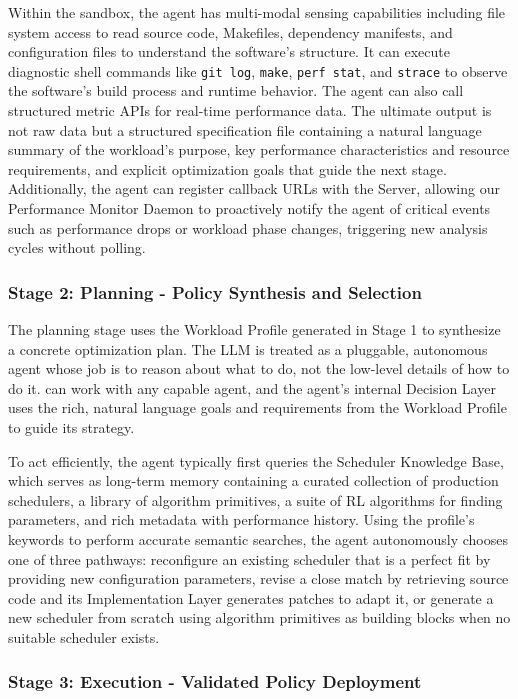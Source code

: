 Within the sandbox, the agent has multi-modal sensing capabilities including file system access to read source code, Makefiles, dependency manifests, and configuration files to understand the software's structure. It can execute diagnostic shell commands like \texttt{git log}, \texttt{make}, \texttt{perf stat}, and \texttt{strace} to observe the software's build process and runtime behavior. The agent can also call structured metric APIs for real-time performance data. The ultimate output is not raw data but a structured specification file containing a natural language summary of the workload's purpose, key performance characteristics and resource requirements, and explicit optimization goals that guide the next stage. Additionally, the agent can register callback URLs with the \sys Server, allowing our Performance Monitor Daemon to proactively notify the agent of critical events such as performance drops or workload phase changes, triggering new analysis cycles without polling.

\subsubsection{Stage 2: Planning - Policy Synthesis and Selection}

The planning stage uses the Workload Profile generated in Stage 1 to synthesize a concrete optimization plan. The LLM is treated as a pluggable, autonomous agent whose job is to reason about what to do, not the low-level details of how to do it. \sys can work with any capable agent, and the agent's internal Decision Layer uses the rich, natural language goals and requirements from the Workload Profile to guide its strategy.

To act efficiently, the agent typically first queries the Scheduler Knowledge Base, which serves as long-term memory containing a curated collection of production schedulers, a library of algorithm primitives, a suite of RL algorithms for finding parameters, and rich metadata with performance history. Using the profile's keywords to perform accurate semantic searches, the agent autonomously chooses one of three pathways: reconfigure an existing scheduler that is a perfect fit by providing new configuration parameters, revise a close match by retrieving source code and its Implementation Layer generates patches to adapt it, or generate a new scheduler from scratch using algorithm primitives as building blocks when no suitable scheduler exists.

\subsubsection{Stage 3: Execution - Validated Policy Deployment}

